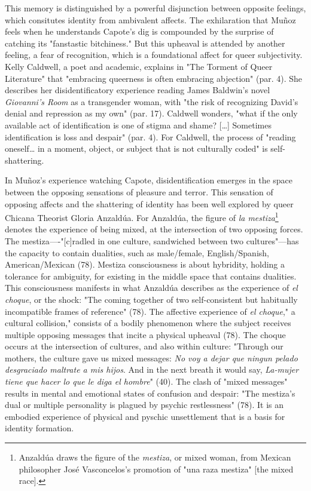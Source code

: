 \documentclass[11pt]{article}
\begin{document}
This memory is distinguished by a powerful disjunction between
opposite feelings, which consitutes identity from ambivalent
affects. The exhilaration that Muñoz feels when he understands
Capote's dig is compounded by the surprise of catching its "fanstastic
bitchiness." But this upheaval is attended by another feeling, a fear
of recognition, which is a foundational affect for queer
subjectivity. Kelly Caldwell, a poet and academic, explains in "The
Torment of Queer Literature" that "embracing queerness is often
embracing abjection" (par. 4). She describes her disidentificatory
experience reading James Baldwin's novel \emph{Giovanni's Room} as a
transgender woman, with "the risk of recognizing David’s denial and
repression as my own" (par. 17). Caldwell wonders, "what if the only
available act of identification is one of stigma and shame? [\ldots{}]
Sometimes identification is loss and despair" (par. 4). For Caldwell,
the process of "reading oneself\ldots{} in a moment, object, or subject
that is not culturally coded" is self-shattering.

In Muñoz's experience watching Capote, disidentification emerges in
the space between the opposing sensations of pleasure and terror. This
sensation of opposing affects and the shattering of identity has been
well explored by queer Chicana Theorist Gloria Anzaldúa. For Anzaldúa,
the figure of \emph{la mestiza}\footnote{Anzaldúa draws the figure of the \emph{mestiza}, or mixed woman,
from Mexican philosopher José Vasconcelos's promotion of "una raza
mestiza" [the mixed race].} denotes the experience of being
mixed, at the intersection of two opposing forces. The
mestiza----"[c]radled in one culture, sandwiched between two
cultures"---has the capacity to contain dualities, such as
male/female, English/Spanish, American/Mexican (78). Mestiza
consciousness is about hybridity, holding a tolerance for ambiguity,
for existing in the middle space that contains dualities. This
consciousness manifests in what Anzaldúa describes as the experience
of \emph{el choque}, or the shock: "The coming together of two
self-consistent but habitually incompatible frames of reference"
(78). The affective experience of \emph{el choque}," a cultural collision,"
consists of a bodily phenomenon where the subject receives multiple
opposing messages that incite a physical upheaval (78). The choque
occurs at the intersection of cultures, and also within culture:
"Through our mothers, the culture gave us mixed messages: \emph{No voy a
dejar que ningun pelado desgraciado maltrate a mis hijos}. And in the
next breath it would say, \emph{La-mujer tiene que hacer lo que le diga el
hombre}" (40). The clash of "mixed messages" results in mental and
emotional states of confusion and despair: "The mestiza's dual or
multiple personality is plagued by psychic restlessness" (78). It is
an embodied experience of physical and pyschic unsettlement that is a
basis for identity formation. 
\end{document}
